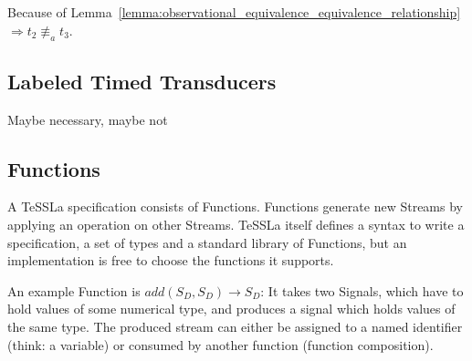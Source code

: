 \begin{exmp}[name=Observational Equivalence]
  Because of Lemma~\ref{lemma:observational_equivalence_equivalence_relationship} \(\Rightarrow t_2 \not\equiv_a t_3\).

\end{exmp}




\subsection{Labeled Timed Transducers}
Maybe necessary, maybe not


\subsection{Functions}
\label{sec:concepts:defs:functions}

A TeSSLa specification consists of Functions.
Functions generate new Streams by applying an operation on other Streams.
TeSSLa itself defines a syntax to write a specification, a set of types and a standard library of Functions, but an implementation is free to choose the functions it supports.

An example Function is \(add(S_D,S_D) \rightarrow S_D\): It takes two Signals, which have to hold values of some numerical type, and produces a signal which holds values of the same type.
The produced stream can either be assigned to a named identifier (think: a variable) or consumed by another function (function composition).

